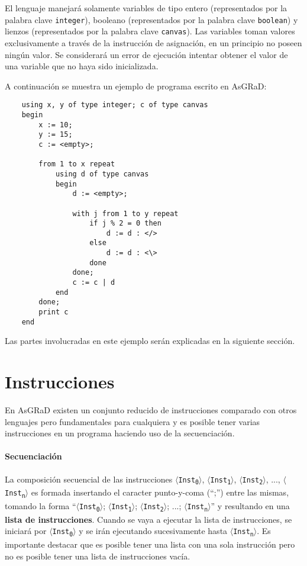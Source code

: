 \documentclass[letterpaper,11pt]{article}
\newcommand{\asgrad}{AsGRaD\xspace}
\newcommand{\general}[1]{$\langle$\texttt{#1}$\rangle$}
\newcommand{\subscript}[2]{#1\textsubscript{#2}}
\begin{document}
El lenguaje manejará solamente variables de tipo entero (representados por la palabra clave \texttt{integer}), booleano (representados por la palabra clave \texttt{boolean}) y lienzos (representados por la palabra clave \texttt{canvas}). Las variables toman valores exclusivamente a través de la instrucción de asignación, en un principio no poseen ningún valor. Se considerará un error de ejecución intentar obtener el valor de una variable que no haya sido inicializada.

A continuación se muestra un ejemplo de programa escrito en \asgrad:

\begin{lstlisting}
    using x, y of type integer; c of type canvas
    begin
        x := 10;
        y := 15;
        c := <empty>;
        
        from 1 to x repeat
            using d of type canvas
            begin
                d := <empty>;
                
                with j from 1 to y repeat
                    if j % 2 = 0 then
                        d := d : </>
                    else
                        d := d : <\>
                    done
                done;
                c := c | d
            end
        done;
        print c
    end
\end{lstlisting}

Las partes involucradas en este ejemplo serán explicadas en la siguiente sección.

\section{Instrucciones}

En \asgrad existen un conjunto reducido de instrucciones comparado con otros lenguajes pero fundamentales para cualquiera y es posible tener varias instrucciones en un programa haciendo uso de la secuenciación.

\paragraph{Secuenciación}

La composición secuencial de las instrucciones \general{\subscript{Inst}{0}}, \general{\subscript{Inst}{1}}, \general{\subscript{Inst}{2}}, ..., \general{\subscript{Inst}{n}} es formada insertando el caracter punto-y-coma (``;'') entre las mismas, tomando la forma ``\general{\subscript{Inst}{0}}; \general{\subscript{Inst}{1}}; \general{\subscript{Inst}{2}}; ...; \general{\subscript{Inst}{n}}'' y resultando en una  \textbf{lista de instrucciones}. Cuando se vaya a ejecutar la lista de instrucciones, se iniciará por \general{\subscript{Inst}{0}} y se irán ejecutando sucesivamente hasta \general{\subscript{Inst}{n}}. Es importante destacar que es posible tener una lista con una sola instrucción pero no es posible tener una lista de instrucciones vacía.
\end{document}
